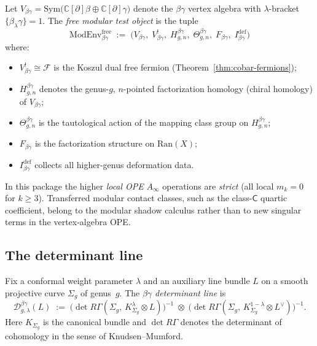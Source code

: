 \begin{definition}
\label{def:betagamma-modular-test-package}
Let $V_{\beta\gamma} = \mathrm{Sym}\bigl(\mathbb{C}[\partial]\beta
\oplus \mathbb{C}[\partial]\gamma\bigr)$ denote the $\beta\gamma$ vertex
algebra with $\lambda$-bracket $\{\beta_\lambda \gamma\} = 1$.
The \emph{free modular test object} is the tuple
\[
 \mathrm{ModEnv}_{\beta\gamma}^{\mathrm{free}}
 \;:=\;
 \bigl(
 V_{\beta\gamma},\;
 V_{\beta\gamma}^{!},\;
 H_{g,n}^{\beta\gamma},\;
 \Theta_{g,n}^{\beta\gamma},\;
 F_{\beta\gamma},\;
 I_{\beta\gamma}^{\mathrm{def}}
 \bigr)
\]
where:
\begin{itemize}
\item $V_{\beta\gamma}^{!} \cong \mathcal{F}$ is the Koszul dual free
 fermion (Theorem~\ref{thm:cobar-fermions});
\item $H_{g,n}^{\beta\gamma}$ denotes the genus-$g$, $n$-pointed
 factorization homology (chiral homology) of $V_{\beta\gamma}$;
\item $\Theta_{g,n}^{\beta\gamma}$ is the tautological action of the
 mapping class group on $H_{g,n}^{\beta\gamma}$;
\item $F_{\beta\gamma}$ is the factorization structure on $\mathrm{Ran}(X)$;
\item $I_{\beta\gamma}^{\mathrm{def}}$ collects all higher-genus deformation
 data.
\end{itemize}
In this package the higher \emph{local OPE} $A_\infty$ operations are
\emph{strict} (all local $m_k = 0$ for $k \geq 3$). Transferred
modular contact classes, such as the class-$\mathsf C$ quartic
coefficient, belong to the modular shadow calculus rather than to
new singular terms in the vertex-algebra OPE.
\end{definition}

\subsection{The determinant line}

\begin{definition}
\label{def:betagamma-determinant-line}
Fix a conformal weight parameter $\lambda$ and an auxiliary line bundle
$L$ on a smooth projective curve $\Sigma_g$ of genus~$g$. The
\emph{$\beta\gamma$ determinant line} is
\begin{equation}\label{eq:betagamma-det-line}
 \mathcal{D}^{\beta\gamma}_{g,\lambda}(L)
 \;:=\;
 \bigl(\!\det R\Gamma(\Sigma_g,\, K_{\Sigma_g}^{\lambda} \otimes L)\bigr)^{-1}
 \;\otimes\;
 \bigl(\!\det R\Gamma(\Sigma_g,\, K_{\Sigma_g}^{1-\lambda} \otimes L^\vee)\bigr)^{-1}.
\end{equation}
Here $K_{\Sigma_g}$ is the canonical bundle and $\det R\Gamma$ denotes the
determinant of cohomology in the sense of Knudsen--Mumford.
\end{definition}

